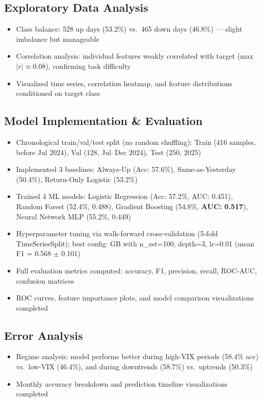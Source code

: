 \documentclass[11pt]{article}
\begin{document}
\subsection*{Exploratory Data Analysis}
\begin{itemize}[nosep, leftmargin=1.2em]
    \item Class balance: 528 up days (53.2\%) vs.\ 465 down days (46.8\%) --- slight imbalance but manageable
    \item Correlation analysis: individual features weakly correlated with target (max $|r| \approx 0.08$), confirming task difficulty
    \item Visualized time series, correlation heatmap, and feature distributions conditioned on target class
\end{itemize}

\subsection*{Model Implementation \& Evaluation}
\begin{itemize}[nosep, leftmargin=1.2em]
    \item Chronological train/val/test split (no random shuffling): Train (416 samples, before Jul 2024), Val (128, Jul--Dec 2024), Test (250, 2025)
    \item Implemented 3 baselines: Always-Up (Acc: 57.6\%), Same-as-Yesterday (50.4\%), Return-Only Logistic (53.2\%)
    \item Trained 4 ML models: Logistic Regression (Acc: 57.2\%, AUC: 0.451), Random Forest (52.4\%, 0.488), Gradient Boosting (54.8\%, \textbf{AUC: 0.517}), Neural Network MLP (55.2\%, 0.449)
    \item Hyperparameter tuning via walk-forward cross-validation (5-fold TimeSeriesSplit); best config: GB with n\_est=100, depth=3, lr=0.01 (mean F1 = 0.568 $\pm$ 0.101)
    \item Full evaluation metrics computed: accuracy, F1, precision, recall, ROC-AUC, confusion matrices
    \item ROC curves, feature importance plots, and model comparison visualizations completed
\end{itemize}

\subsection*{Error Analysis}
\begin{itemize}[nosep, leftmargin=1.2em]
    \item Regime analysis: model performs better during high-VIX periods (58.4\% acc) vs.\ low-VIX (46.4\%), and during downtrends (58.7\%) vs.\ uptrends (50.3\%)
    \item Monthly accuracy breakdown and prediction timeline visualizations completed
\end{itemize}
\end{document}
